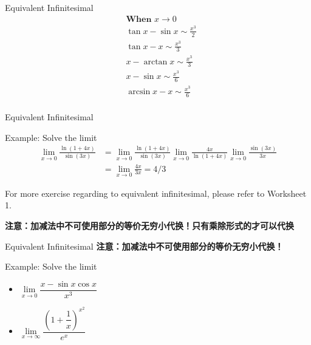 

\begin{frame}{Equivalent Infinitesimal}
	$$
		\begin{aligned}
			 & \textbf{When } x \rightarrow 0     \\
			 & \tan x-\sin x \sim \frac{x^{3}}{2} \\
			 & \tan x-x \sim \frac{x^{3}}{3}      \\
			 & x-\arctan x \sim \frac{x^{3}}{3}   \\
			 & x-\sin x \sim \frac{x^{3}}{6}      \\
			 & \arcsin x-x \sim \frac{x^{3}}{6}   \\
		\end{aligned}
	$$
\end{frame}





\begin{frame}{Equivalent Infinitesimal}
	\begin{block}{Example: Solve the limit}
		$$
			\begin{aligned}
				\lim _{x \rightarrow 0} \frac{\ln (1+4 x)}{\sin (3 x)} & =\lim _{x \rightarrow 0} \frac{\ln (1+4 x)}{\sin (3 x)} \lim _{x \rightarrow 0} \frac{4 x}{\ln (1+4 x)} \lim _{x \rightarrow 0} \frac{\sin (3 x)}{3 x} \\&=\lim _{x \rightarrow 0} \frac{4 x}{3 x}=4 / 3
			\end{aligned}
		$$
	\end{block}
	For more exercise regarding to equivalent infinitesimal, please refer to Worksheet 1.

	\vspace*{1em}

	\textbf{注意：加减法中不可使用部分的等价无穷小代换！只有乘除形式的才可以代换}


\end{frame}

\begin{frame}{Equivalent Infinitesimal}
	\textbf{注意：加减法中不可使用部分的等价无穷小代换！}
	\begin{block}{Example: Solve the limit}
		\begin{itemize}
			\item $\lim \limits_{x \to 0} \dfrac{x-\sin x\cos x}{x^3}$
			\item $\lim \limits_{x \to \infty} \dfrac{(1+\dfrac{1}{x})^{x^2}}{e^x}$
		\end{itemize}
	\end{block}




\end{frame}

